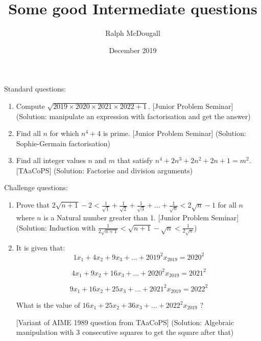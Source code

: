 \documentclass[a4paper,12pt]{article}
\begin{document}
\title {Some good Intermediate questions}
\author{Ralph McDougall}
\date{December 2019}
\maketitle

Standard questions:

\begin{enumerate}
\item Compute $\sqrt{2019 \times 2020 \times 2021 \times 2022 + 1}$. [Junior Problem Seminar](Solution: manipulate an expression with factorisation and get the answer)

\item Find all $n$ for which $n^4 + 4$ is prime. [Junior Problem Seminar] (Solution: Sophie-Germain factorisation)

\item Find all integer values $n$ and $m$ that satisfy $n^4 + 2n^3 + 2n^2 + 2n + 1 = m^2$. [TAaCoPS] (Solution: Factorise and division arguments) 

\end{enumerate}

Challenge questions:

\begin{enumerate}
\item Prove that $2\sqrt{n + 1} - 2 < \frac{1}{\sqrt{1}} + \frac{1}{\sqrt{2}} + \frac{1}{\sqrt{3}} + ... + \frac{1}{\sqrt{n}} < 2\sqrt{n} - 1$ for all $n$ where $n$ is a Natural number greater than 1. [Junior Problem Seminar] (Solution: Induction with $\frac{1}{2\sqrt{n + 1}} < \sqrt{n + 1} - \sqrt{n} < \frac{1}{2\sqrt{n}}$)

\item It is given that:
$$1x_1 + 4x_2 + 9x_3 + ... + 2019^2x_{2019} = 2020^2$$

$$4x_1 + 9x_2 + 16x_3 + ... + 2020^2x_{2019} = 2021^2$$

$$9x_1 + 16x_2 + 25x_3 + ... + 2021^2x_{2019} = 2022^2$$

What is the value of $16x_1 + 25x_2 + 36x_3 + ... + 2022^2x_{2019}$ ?

[Variant of AIME 1989 question from TAaCoPS] (Solution: Algebraic manipulation with 3 consecutive squares to get the square after that)

\end{enumerate}
\end{document}
